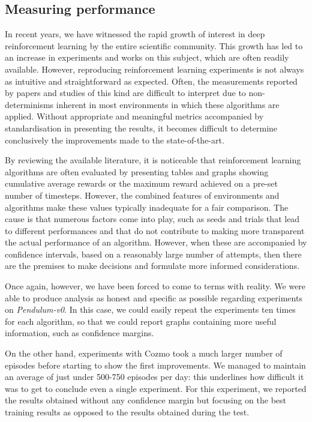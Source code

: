\subsection{Measuring performance}

In recent years, we have witnessed the rapid growth of interest in deep reinforcement learning by the entire scientific community.
This growth has led to an increase in experiments and works on this subject, which are often readily available.
However, reproducing reinforcement learning experiments is not always as intuitive and straightforward as expected.
Often, the measurements reported by papers and studies of this kind are difficult to interpret due to non-determinisms inherent in most environments in which these algorithms are applied.
Without appropriate and meaningful metrics accompanied by standardisation in presenting the results, it becomes difficult to determine conclusively the improvements made to the state-of-the-art.

By reviewing the available literature, it is noticeable that reinforcement learning algorithms are often evaluated by presenting tables and graphs showing cumulative average rewards or the maximum reward achieved on a pre-set number of timesteps.
However, the combined features of environments and algorithms make these values typically inadequate for a fair comparison.
The cause is that numerous factors come into play, such as seeds and trials that lead to different performances and that do not contribute to making more transparent the actual performance of an algorithm.
However, when these are accompanied by confidence intervals, based on a reasonably large number of attempts, then there are the premises to make decisions and formulate more informed considerations.

Once again, however, we have been forced to come to terms with reality.
We were able to produce analysis as honest and specific as possible regarding experiments on \textit{Pendulum-v0}.
In this case, we could easily repeat the experiments ten times for each algorithm, so that we could report graphs containing more useful information, such as confidence margins.

On the other hand, experiments with Cozmo took a much larger number of episodes before starting to show the first improvements.
We managed to maintain an average of just under 500-750 episodes per day: this underlines how difficult it was to get to conclude even a single experiment.
For this experiment, we reported the results obtained without any confidence margin but focusing on the best training results as opposed to the results obtained during the test.

